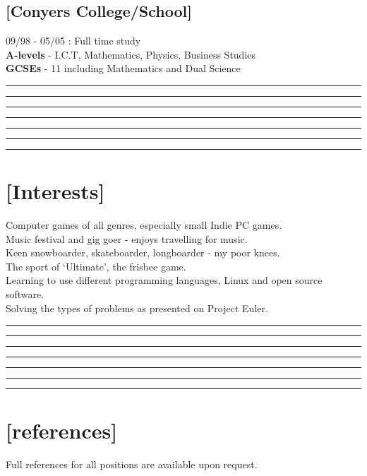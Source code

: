 \documentclass[a4paper]{res}
\newcommand{\setrule}[1]{\rule{#1}{1mm}}
\newcommand{\fibrule}[2]{ \hspace{#1}  \setrule{#2} \setrule{21mm} \setrule{13mm} \setrule{8mm} \setrule{5mm} \setrule{3mm} \setrule{2mm}  \vspace{-.52in} }
\begin{document}
\begin{resume}
\vspace{-.22in}

\subsection{[Conyers College/School]} 09/98 - 05/05 : Full time study\\
{\bf A-levels} - I.C.T, Mathematics, Physics, Business Studies \\
{\bf GCSEs} - 11 including  Mathematics and Dual Science 

\fibrule{0.9in}{3.0in}
\section{[Interests]} 

Computer games of all genres, especially small Indie PC games.\\
Music festival and gig goer - enjoys travelling for music. \\
Keen snowboarder, skateboarder, longboarder - my poor knees. \\
The sport of `Ultimate', the frisbee game. \\
Learning to use different programming languages, Linux and open source software.\\
Solving the types of problems as presented on Project Euler.

\fibrule{1.075in}{2.825in}
\section{[references]} 

Full references for all positions are available upon request.


\end{resume}
\end{document}
